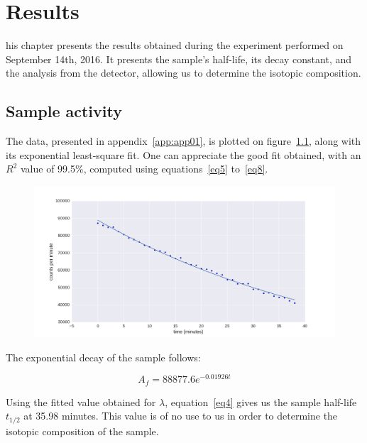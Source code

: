%
%
\let\textcircled=\pgftextcircled
\chapter{Results}
\label{chap:result}

his chapter presents the results obtained during the experiment performed on September 14th, 2016. It presents the sample's half-life, its decay constant, and the analysis from the detector, allowing us to determine the isotopic composition.

\section{Sample activity}

The data, presented in appendix~\ref{app:app01}, is plotted on figure~\ref{fig:actsample}, along with its exponential least-square fit. One can appreciate the good fit obtained, with an $R^2$ value of 99.5\%, computed using equations~\ref{eq5} to~\ref{eq8}.

\begin{figure}[t!]
	\centering
	\includegraphics[height=0.4\textheight]{fig02/plot.png}
	\label{fig:actsample}
\end{figure}

The exponential decay of the sample follows:

\begin{equation}\label{eq9}
A_f = 88877.6 e^{-0.01926 t}
\end{equation}

Using the fitted value obtained for $\lambda$, equation~\ref{eq4} gives us the sample half-life $t_{1/2}$ at 35.98 minutes. This value is of no use to us in order to determine the isotopic composition of the sample.

